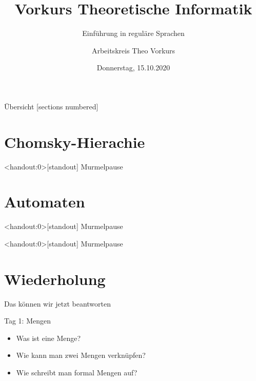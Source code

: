 

\title{Vorkurs Theoretische Informatik}
\subtitle{Einführung in reguläre Sprachen}
\date{Donnerstag, 15.10.2020}
\author{Arbeitskreis  Theo Vorkurs}



\maketitle

\begin{frame}[fragile]{Übersicht}
  [sections numbered]
  \tableofcontents%
\end{frame}


\section{Chomsky-Hierachie}



\begin{frame}<handout:0>[standout]
  Murmelpause
\end{frame}

\section{Automaten}



\begin{frame}<handout:0>[standout]
  Murmelpause
\end{frame}







\begin{frame}<handout:0>[standout]
  Murmelpause
\end{frame}

\section{Wiederholung}
\begin{frame}[fragile]{Das können wir jetzt beantworten}
	\begin{alertblock}{Tag 1: Mengen}
		\begin{itemize}
			\item Was ist eine Menge?
			\item Wie kann man zwei Mengen verknüpfen?
			\item Wie schreibt man formal Mengen auf?
		\end{itemize}
	\end{alertblock}
\end{frame}

